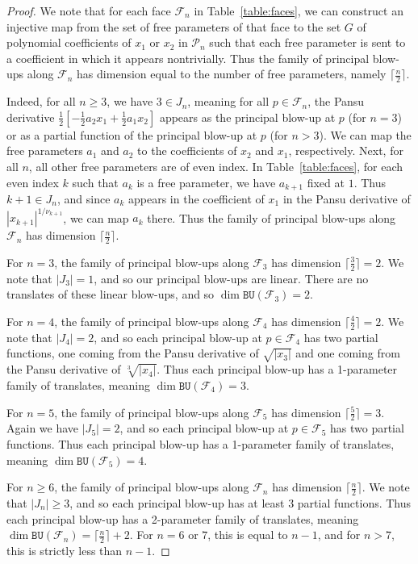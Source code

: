 \documentclass{article}
\theoremstyle{definition}
\newcommand{\BU}{\mathtt{BU}}
\newcommand{\cF}{{\mathcal F}}
\begin{document}
\begin{proof}
We note that for each face $\cF_n$ in Table~\ref{table:faces}, we can construct an injective map from the set of free parameters of that face to the set $G$ of polynomial coefficients of $x_1$ or $x_2$ in $\mathcal P_n$ such that each free parameter is sent to a coefficient in which it appears nontrivially. Thus the family of principal blow-ups along $\cF_n$ has dimension equal to the number of free parameters, namely $\lceil \frac{n}{2}\rceil$.

Indeed, for all $n \geq 3$, we have $3 \in J_n$, meaning for all $p \in \cF_n$, the Pansu derivative $\frac{1}{2}\left[-\frac12a_2x_1 + \frac12a_1x_2\right]$ appears as the principal blow-up at $p$ (for $n=3$) or as a partial function of the principal blow-up at $p$ (for $n > 3$). We can map the free parameters $a_1$ and $a_2$ to the coefficients of $x_2$ and $x_1$, respectively. 
Next, for all $n$, all other free parameters are of even index. In Table~\ref{table:faces}, for each even index $k$ such that $a_k$ is a free parameter, we have $a_{k+1}$ fixed at $1$. Thus $k+1 \in J_n$, and since $a_k$ appears in the coefficient of $x_1$ in the Pansu derivative of $|x_{k+1}|^{1/\nu_{k+1}}$, we can map $a_k$ there. Thus the family of principal blow-ups along $\cF_n$ has dimension $\lceil \frac{n}{2}\rceil$.

For $n=3$, the family of principal blow-ups along $\cF_3$ has dimension $\lceil \frac{3}{2}\rceil = 2$. We note that $|J_3| = 1$, and so our principal blow-ups are linear. There are no translates of these linear blow-ups, and so $\dim \BU(\cF_3) = 2$.

For $n=4$, the family of principal blow-ups along $\cF_4$ has dimension $\lceil \frac{4}{2}\rceil = 2$. We note that $|J_4| = 2$, and so each principal blow-up at $p \in \cF_4$ has two partial functions, one coming from the Pansu derivative of $\sqrt{|x_3|}$ and one coming from the Pansu derivative of $\sqrt[3]{|x_4|}$. Thus each principal blow-up has a 1-parameter family of translates, meaning $\dim \BU (\cF_4) = 3$.

For $n = 5$, the family of principal blow-ups along $\cF_5$ has dimension $\lceil \frac{5}{2}\rceil = 3$. Again we have $|J_5| = 2$, and so each principal blow-up at $p \in \cF_5$ has two partial functions. Thus each principal blow-up has a 1-parameter family of translates, meaning $\dim \BU (\cF_5) = 4$.

For $n \geq 6$, the family of principal blow-ups along $\cF_n$ has dimension $\lceil \frac{n}{2}\rceil$. We note that $|J_n| \geq 3$, and so each principal blow-up has at least 3 partial functions. Thus each principal blow-up has a 2-parameter family of translates, meaning $\dim \BU (\cF_n) = \lceil\frac{n}{2}\rceil +2$. For $n =6$ or $7$, this is equal to $n-1$, and for $n > 7$, this is strictly less than $n-1$.
\end{proof}
\end{document}

